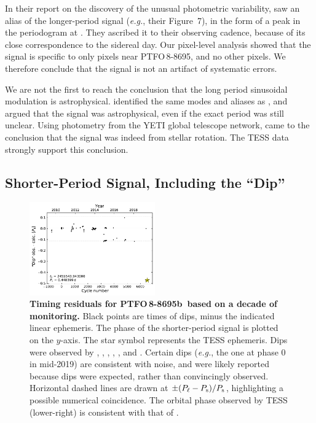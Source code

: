 \documentclass[12pt,twocolumn,tighten,trackchanges]{aastex62}
\newcommand{\ptfo}{PTFO$\,$8-8695}
\newcommand{\ptfob}{PTFO$\,$8-8695b}
\begin{document}
In their report on the discovery of the unusual photometric
variability, \citet{van_eyken_ptf_2012} saw an alias of the
longer-period signal ({\it e.g.}, their Figure~7), in the form of a
peak in the periodogram at . They ascribed it to their
observing cadence, because of its close correspondence to the sidereal
day.  Our pixel-level analysis showed that the signal is specific to
only pixels near \ptfo, and no other pixels.  We therefore conclude
that the signal is not an artifact of systematic errors.

We are not the first to reach the conclusion that the long period
sinusoidal modulation is astrophysical.  \citet{koen_multicolour_2015}
identified the same modes and aliases as \citet{van_eyken_ptf_2012},
and argued that the signal was astrophysical, even if the exact period
was still unclear.  Using photometry from the YETI global telescope
network, \citet{raetz_yeti_2016} came to the conclusion that the
 signal was indeed from stellar
rotation.  The TESS data strongly support this conclusion.



\subsection{Shorter-Period Signal, Including the ``Dip''}

\begin{figure}[t]
	\begin{center}
		\leavevmode
		\includegraphics[width=0.48\textwidth]{f6.pdf}
	\end{center}
	\vspace{-0.7cm}
	\caption{
    {\bf Timing residuals for \ptfob\ based on a decade of
    monitoring.} Black points are times of dips, minus the indicated
    linear ephemeris.  The phase of the shorter-period signal is
    plotted on the $y$-axis. The star symbol represents the TESS
    ephemeris.  Dips were observed by \citet{van_eyken_ptf_2012},
    \citet{ciardi_followup_2015}, \citet{yu_tests_2015},
    \citet{raetz_yeti_2016}, \citet{onitsuka_multicolor_2017}, and
    \citet{tanimoto_evidence_2020}.  Certain dips ({\it e.g.}, the one
    at phase 0 in mid-2019) are consistent with noise, and were likely
    reported because dips were expected, rather than convincingly
    observed.  Horizontal dashed lines are drawn at $\pm (P_{\rm \ell}
    - P_{\rm s})/P_{\rm s}$, highlighting a possible numerical
    coincidence.  The orbital phase observed by TESS (lower-right) is
    consistent with that of \citet{tanimoto_evidence_2020}.
		\label{fig:o_minus_c}
	}
\end{figure}
\end{document}
